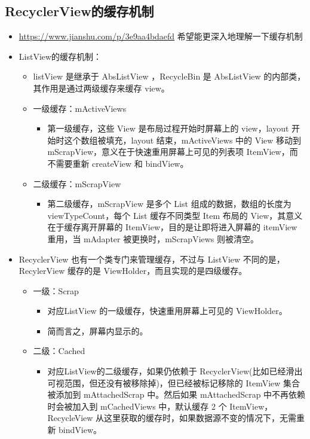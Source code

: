 \documentclass[9pt, b5paper]{article}
\begin{document}
\subsection{RecyclerView的缓存机制}
\label{sec-5-4}
\begin{itemize}
\item \url{https://www.jianshu.com/p/3e9aa4bdaefd} 希望能更深入地理解一下缓存机制
\item ListView的缓存机制：
\begin{itemize}
\item listView 是继承于 AbsListView ，RecycleBin 是 AbsListView 的内部类，其作用是通过两级缓存来缓存 view。
\item 一级缓存：mActiveViews
\begin{itemize}
\item 第一级缓存，这些 View 是布局过程开始时屏幕上的 view，layout 开始时这个数组被填充，layout 结束，mActiveViews 中的 View 移动到 mScrapView，意义在于快速重用屏幕上可见的列表项 ItemView，而不需要重新 createView 和 bindView。
\end{itemize}
\item 二级缓存：mScrapView
\begin{itemize}
\item 第二级缓存，mScrapView 是多个 List 组成的数据，数组的长度为 viewTypeCount，每个 List 缓存不同类型 Item 布局的 View，其意义在于缓存离开屏幕的 ItemView，目的是让即将进入屏幕的 itemView 重用，当 mAdapter 被更换时，mScrapViews 则被清空。
\end{itemize}
\end{itemize}
\item RecyclerView 也有一个类专门来管理缓存，不过与 ListView 不同的是，RecylerView 缓存的是 ViewHolder，而且实现的是四级缓存。
\begin{itemize}
\item 一级：Scrap
\begin{itemize}
\item 对应ListView 的一级缓存，快速重用屏幕上可见的 ViewHolder。
\item 简而言之，屏幕内显示的。
\end{itemize}
\item 二级：Cached
\begin{itemize}
\item 对应ListView的二级缓存，如果仍依赖于 RecyclerView(比如已经滑出可视范围，但还没有被移除掉)，但已经被标记移除的 ItemView 集合被添加到 mAttachedScrap 中。然后如果 mAttachedScrap 中不再依赖时会被加入到 mCachedViews 中，默认缓存 2 个 ItemView，RecycleView 从这里获取的缓存时，如果数据源不变的情况下，无需重新 bindView。

\end{itemize}
\end{itemize}
\end{itemize}
\end{document}
